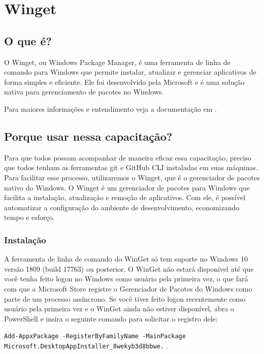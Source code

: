 \chapter{Winget}
\par
\section{O que é?}
O Winget, ou Windows Package Manager, é uma ferramenta de linha de comando para Windows que permite instalar, atualizar e gerenciar aplicativos de forma simples e eficiente. Ele foi desenvolvido pela Microsoft e é uma solução nativa para gerenciamento de pacotes no Windows.

Para maiores informações e entendimento veja a documentação em \cite{microsoft_winget}.
\par
\section{Porque usar nessa capacitação?}
Para que todos possam acompanhar de maneira eficaz essa capacitação, preciso que todos tenham as ferramentas git e GitHub CLI instaladas em suas máquinas. Para facilitar esse processo, utilizaremos o Winget, que é o gerenciador de pacotes nativo do Windows.
O Winget é um gerenciador de pacotes para Windows que facilita a instalação, atualização e remoção de aplicativos. Com ele, é possível automatizar a configuração do ambiente de desenvolvimento, economizando tempo e esforço.
\par
\subsection{Instalação}
\par
\begin{citacao}
A ferramenta de linha de comando do WinGet só tem suporte no Windows 10 versão 1809 (build 17763) ou posterior. 
O WinGet não estará disponível até que você tenha feito logon no Windows como usuário pela primeira vez, 
o que fará com que a Microsoft Store registre o Gerenciador de Pacotes do Windows como parte de um processo assíncrono. 
Se você tiver feito logon recentemente como usuário pela primeira vez e o WinGet ainda não estiver disponível, 
abra o PowerShell e insira o seguinte comando para solicitar o registro dele: 

\texttt{Add-AppxPackage -RegisterByFamilyName -MainPackage Microsoft.DesktopAppInstaller\_8wekyb3d8bbwe.}
.
\end{citacao}

